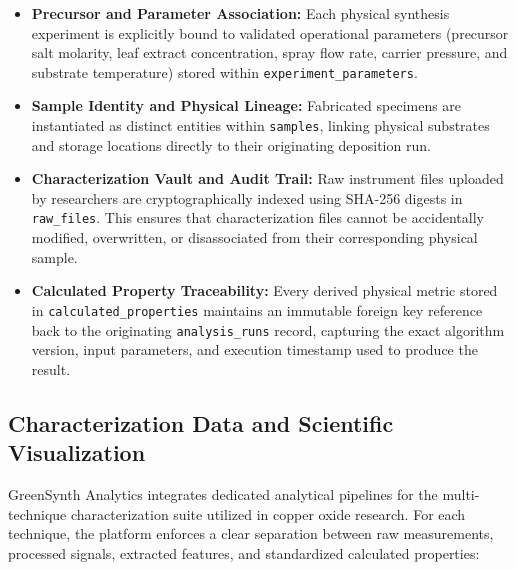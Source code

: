 \documentclass[12pt,a4paper,oneside]{report}
\begin{document}
{{{\begin{itemize}
    \item \textbf{Precursor and Parameter Association:} Each physical synthesis experiment is explicitly bound to validated operational parameters (precursor salt molarity, leaf extract concentration, spray flow rate, carrier pressure, and substrate temperature) stored within \texttt{experiment\_parameters}.
    \item \textbf{Sample Identity and Physical Lineage:} Fabricated specimens are instantiated as distinct entities within \texttt{samples}, linking physical substrates and storage locations directly to their originating deposition run.
    \item \textbf{Characterization Vault and Audit Trail:} Raw instrument files uploaded by researchers are cryptographically indexed using SHA-256 digests in \texttt{raw\_files}. This ensures that characterization files cannot be accidentally modified, overwritten, or disassociated from their corresponding physical sample.
    \item \textbf{Calculated Property Traceability:} Every derived physical metric stored in \texttt{calculated\_properties} maintains an immutable foreign key reference back to the originating \texttt{analysis\_runs} record, capturing the exact algorithm version, input parameters, and execution timestamp used to produce the result.
\end{itemize}

\subsection{Characterization Data and Scientific Visualization}

GreenSynth Analytics integrates dedicated analytical pipelines for the multi-technique characterization suite utilized in copper oxide research. For each technique, the platform enforces a clear separation between raw measurements, processed signals, extracted features, and standardized calculated properties:

}}}
\end{document}
